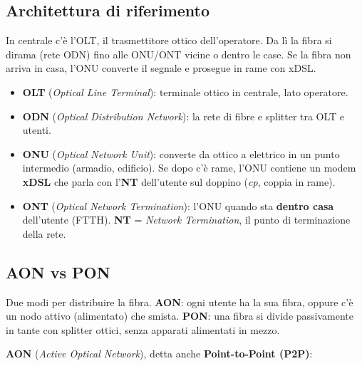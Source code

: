 \subsection{Architettura di riferimento}

\begin{inbreve}

In centrale c'è l'OLT, il trasmettitore ottico dell'operatore. Da lì la fibra si dirama (rete ODN) fino alle ONU/ONT vicine o dentro le case. Se la fibra non arriva in casa, l'ONU converte il segnale e prosegue in rame con xDSL.

\end{inbreve}

\begin{itemize}
\tightlist
\item
  \textbf{OLT} (\emph{Optical Line Terminal}): terminale ottico in centrale, lato operatore.
\item
  \textbf{ODN} (\emph{Optical Distribution Network}): la rete di fibre e splitter tra OLT e utenti.
\item
  \textbf{ONU} (\emph{Optical Network Unit}): converte da ottico a elettrico in un punto intermedio (armadio, edificio). Se dopo c'è rame, l'ONU contiene un modem \textbf{xDSL} che parla con l'\textbf{NT} dell'utente sul doppino (\emph{cp}, coppia in rame).
\item
  \textbf{ONT} (\emph{Optical Network Termination}): l'ONU quando sta \textbf{dentro casa} dell'utente (FTTH). \textbf{NT} = \emph{Network Termination}, il punto di terminazione della rete.
\end{itemize}

\subsection{AON vs PON}

\begin{inbreve}

Due modi per distribuire la fibra. \textbf{AON}: ogni utente ha la sua fibra, oppure c'è un nodo attivo (alimentato) che smista. \textbf{PON}: una fibra si divide passivamente in tante con splitter ottici, senza apparati alimentati in mezzo.

\end{inbreve}

\textbf{AON} (\emph{Active Optical Network}), detta anche \textbf{Point-to-Point (P2P)}:

